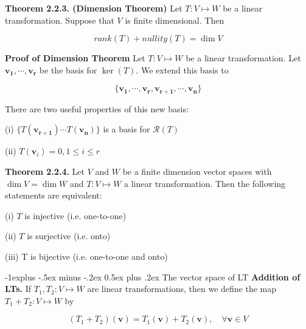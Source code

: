 \documentclass[10pt,landscape]{article}
\makeatletter
\renewcommand{\subsection}{\@startsection{subsection}{2}{0mm}%
                                {-1explus -.5ex minus -.2ex}%
                                {0.5ex plus .2ex}%
                                {\normalfont\normalsize\bfseries}}
\makeatother
\begin{document}
\begin{multicols}{4}


\textbf{Theorem 2.2.3. (Dimension Theorem)} Let $T : V \mapsto W$ be a linear transformation. Suppose that $V$ is finite dimensional. Then

$$
rank(T) + nullity(T) = \dim V
$$

\textbf{Proof of Dimension Theorem} Let $T: V \mapsto W$ be a linear transformation. Let ${\mathbf{v_1, \cdots, v_r}}$ be the basis for $\ker (T)$. We extend this basis to 

$$
\{ \mathbf{v_1, \cdots, v_r, v_{r+1}, \cdots, v_n} \}
$$

There are two useful properties of this new basis:

(i) $\{ T(\mathbf{v_{r+1}}) \cdots T(\mathbf{v_{n}}) \}$ is a basis for $\mathcal{R}(T)$

(ii) $T(\mathbf{v}_i) = 0, 1 \leq i \leq r$

\textbf{Theorem 2.2.4.} Let $V$ and $W$ be a finite dimension vector spaces with $\dim V = \dim W$ and $T : V \mapsto W$ a linear transformation. Then the following statements are equivalent:

(i) $T$ is injective (i.e. one-to-one)

(ii) $T$ is surjective (i.e. onto)

(iii) T is bijective (i.e. one-to-one and onto)







\subsection{The vector space of LT}
\textbf{Addition of LTs.} If $T_1, T_2: V \mapsto W$ are linear transformations, then we define the map $T_1 + T_2 : V \mapsto W$ by

$$
(T_1 + T_2)(\mathbf{v}) = T_1(\mathbf{v}) + T_2(\mathbf{v}), \quad \forall \mathbf{v} \in V
$$


\end{multicols}
\end{document}
